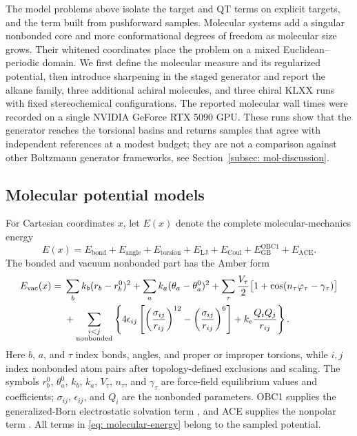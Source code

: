 \documentclass{article}
\begin{document}
The model problems above isolate the target and QT terms on explicit targets, and the term built from pushforward samples. Molecular systems add a singular nonbonded core and more conformational degrees of freedom as molecular size grows. Their whitened coordinates \citep{noe2019boltzmann} place the problem on a mixed Euclidean--periodic domain. We first define the molecular measure and its regularized potential, then introduce sharpening in the staged generator and report the alkane family, three additional achiral molecules, and three chiral KLXX runs with fixed stereochemical configurations. The reported molecular wall times were recorded on a single NVIDIA GeForce RTX 5090 GPU. {\color{blue}These runs show that the generator reaches the torsional basins and returns samples that agree with independent references at a modest budget; they are not a comparison against other Boltzmann generator frameworks, see Section~\ref{subsec: mol-discussion}.}

\subsection{Molecular potential models}
\label{sec: mol-models}

For Cartesian coordinates \(x\), let \(E(x)\) denote the complete molecular-mechanics energy
\begin{equation}
E(x)
=E_{\mathrm{bond}}+E_{\mathrm{angle}}+E_{\mathrm{torsion}}
 +E_{\mathrm{LJ}}+E_{\mathrm{Coul}}
 +E_{\mathrm{GB}}^{\mathrm{OBC1}}+E_{\mathrm{ACE}} .
\label{eq: molecular-energy}
\end{equation}
The bonded and vacuum nonbonded part has the Amber form \citep{cornell1995amber}
\begin{align}
E_{\mathrm{vac}}(x)
={}&\sum_{b} k_b(r_b-r_b^0)^2
 +\sum_{a} k_a(\theta_a-\theta_a^0)^2
 +\sum_{\tau}\frac{V_\tau}{2}
       \bigl[1+\cos(n_\tau\varphi_\tau-\gamma_\tau)\bigr] \notag\\
&+\sum_{\substack{i<j\\\mathrm{nonbonded}}}
 \left\lbrace 4\epsilon_{ij}\left[
 \left(\frac{\sigma_{ij}}{r_{ij}}\right)^{12}
 -\left(\frac{\sigma_{ij}}{r_{ij}}\right)^6\right]
 +k_{\mathrm e}\frac{Q_iQ_j}{r_{ij}}\right\rbrace .
\label{eq: molecular-amber-energy}
\end{align}
Here $b$, $a$, and $\tau$ index bonds, angles, and proper or improper torsions, while $i,j$ index nonbonded atom pairs after topology-defined exclusions and scaling. The symbols $r_b^0$, $\theta_a^0$, $k_b$, $k_a$, $V_\tau$, $n_\tau$, and $\gamma_\tau$ are force-field equilibrium values and coefficients; $\sigma_{ij}$, $\epsilon_{ij}$, and {\color{purple}$Q_i$} are the nonbonded parameters. OBC1 supplies the generalized-Born electrostatic solvation term \citep{onufriev2004gb}, and ACE supplies the nonpolar term \citep{schaefer1996ace}. All terms in \eqref{eq: molecular-energy} belong to the sampled potential.
\end{document}
